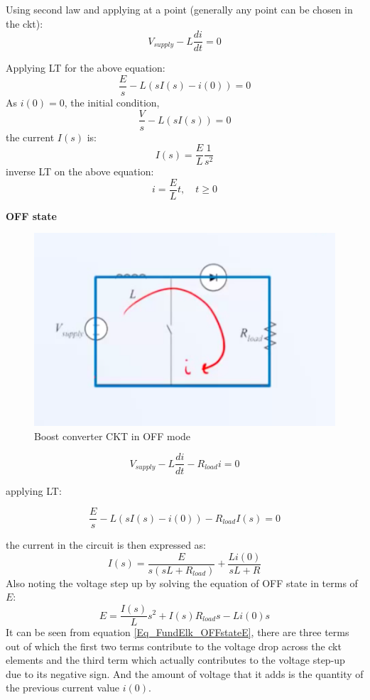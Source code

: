 Using second law and applying at a point (generally any point can be chosen in the ckt):
\begin{equation}
	V_{supply} - L \frac{di}{dt} = 0
\end{equation}

Applying LT for the above equation:
\begin{equation}
	\frac{E}{s} - L (sI(s) - i(0)) = 0
\end{equation}
As $i(0) = 0$, the initial condition, $$ \frac{V}{s} - L (sI(s)) = 0 $$ the current $I(s)$ is:
\begin{equation}
	I(s) = \frac{E}{L}\frac{1}{s^2}
\end{equation}
inverse LT on the above equation:
\begin{equation}
	i = \frac{E}{L} t, \quad t \geq 0 \label{Eq_Fund_Elk_Boost_ON}
\end{equation}

\textbf{OFF state}

\begin{figure}[h!]
	\centering
	\includegraphics[width=0.75\linewidth]{Bilder/Fund_ELK_Boost_OFF}
	\caption{Boost converter CKT in OFF mode}
	\label{Fig_Fund_ELK_Boost_OFF}
\end{figure}

\begin{equation}
	V_{supply} - L \frac{di}{dt} - R_{load} i = 0
\end{equation}

applying LT:

\begin{equation}
	\frac{E}{s} - L (sI(s) - i(0)) - R_{load} I(s) = 0
\end{equation}

the current in the circuit is then expressed as:
\begin{equation}
	I(s) = \frac{E}{s(sL + R_{load})} + \frac{Li(0)}{sL + R} \label{Eq_Fund_Elk_CurrentEq}
\end{equation}
Also noting the voltage step up by solving the equation of OFF state in terms of $E$:
\begin{equation}
	E = \frac{I(s)}{L} s^2 + I(s) R_{load} s - L i(0) s \label{Eq_FundElk_OFFstateE}
\end{equation}
It can be seen from equation \ref{Eq_FundElk_OFFstateE}, there are three terms out of which the first two terms contribute to the voltage drop across the ckt elements and the third term which actually contributes to the voltage step-up due to its negative sign. And the amount of voltage that it adds is the quantity of the previous current value $i(0)$.


